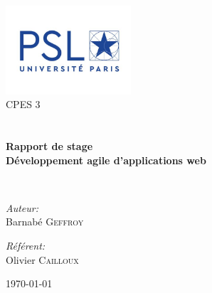 \begin{titlepage}
\begin{center}

\includegraphics[width=0.35\textwidth]{assets/logo.jpg}~\\[1cm]

\textsc{\LARGE CPES 3}\\[1.5cm]

\textsc{\Large }\\[0.5cm]

\HRule \\[0.4cm]

{\huge \bfseries Rapport de stage\\
Développement agile d’applications web \\[0.4cm] }

\HRule \\[1.5cm]

\begin{minipage}{0.4\textwidth}
\begin{flushleft} \large
\emph{Auteur:}\\
Barnabé \textsc{Geffroy}\\
\end{flushleft}
\end{minipage}
\begin{minipage}{0.4\textwidth}
\begin{flushright} \large
\emph{Référent:} \\
Olivier \textsc{Cailloux}
\end{flushright}
\end{minipage}

\vfill

{\large \today}

\end{center}
\end{titlepage}
